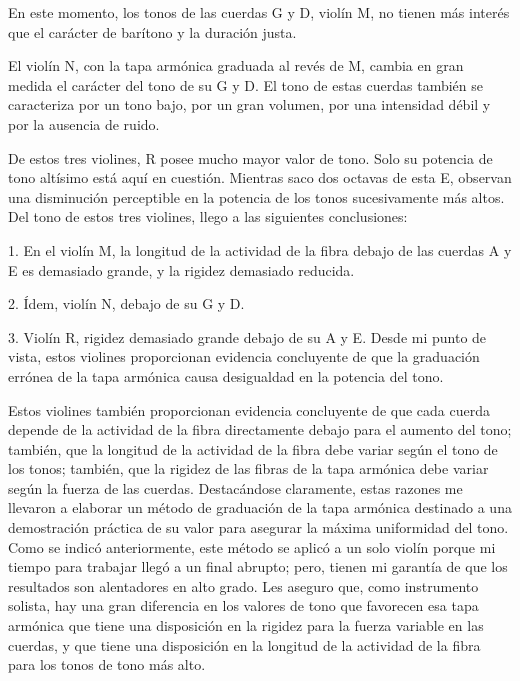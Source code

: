 \documentclass[12pt]{book}
\begin{document}
En este momento, los tonos de las cuerdas G y D, violín M, no tienen más interés que el carácter de barítono y la duración justa.

El violín N, con la tapa armónica graduada al revés de M, cambia en gran medida el carácter del tono de su G y D. El tono de estas cuerdas también se caracteriza por un tono bajo, por un gran volumen, por una intensidad débil y por la ausencia de ruido.

De estos tres violines, R posee mucho mayor valor de tono. Solo su potencia de tono altísimo está aquí en cuestión. Mientras saco dos octavas de esta E, observan una disminución perceptible en la potencia de los tonos sucesivamente más altos. Del tono de estos tres violines, llego a las siguientes conclusiones:

1. En el violín M, la longitud de la actividad de la fibra debajo de las cuerdas A y E es demasiado grande, y la rigidez demasiado reducida.

2. Ídem, violín N, debajo de su G y D.

3. Violín R, rigidez demasiado grande debajo de su A y E. Desde mi punto de vista, estos violines proporcionan evidencia concluyente de que la graduación errónea de la tapa armónica causa desigualdad en la potencia del tono.

Estos violines también proporcionan evidencia concluyente de que cada cuerda depende de la actividad de la fibra directamente debajo para el aumento del tono; también, que la longitud de la actividad de la fibra debe variar según el tono de los tonos; también, que la rigidez de las fibras de la tapa armónica debe variar según la fuerza de las cuerdas. Destacándose claramente, estas razones me llevaron a elaborar un método de graduación de la tapa armónica destinado a una demostración práctica de su valor para asegurar la máxima uniformidad del tono. Como se indicó anteriormente, este método se aplicó a un solo violín porque mi tiempo para trabajar llegó a un final abrupto; pero, tienen mi garantía de que los resultados son alentadores en alto grado. Les aseguro que, como instrumento solista, hay una gran diferencia en los valores de tono que favorecen esa tapa armónica que tiene una disposición en la rigidez para la fuerza variable en las cuerdas, y que tiene una disposición en la longitud de la actividad de la fibra para los tonos de tono más alto.
\end{document}
